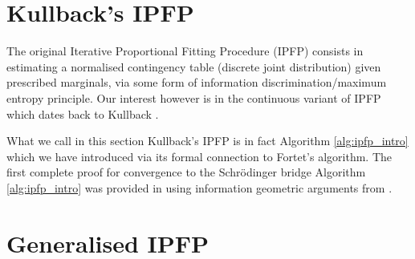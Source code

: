 \documentclass[a4paper,12pt,twoside,openright]{report}
\theoremstyle{definition}
\begin{document}
\section{Kullback's IPFP}
The original Iterative Proportional Fitting Procedure (IPFP) consists in estimating a normalised contingency table (discrete joint distribution) given prescribed marginals, via some form of information discrimination/maximum entropy principle. Our interest however is in the continuous variant of IPFP which dates back to Kullback \citep{kullback1968probability}.

What we call in this section Kullback's IPFP is in fact Algorithm \ref{alg:ipfp_intro} which we have introduced via its formal connection to Fortet's algorithm.  The first complete proof for convergence to the  Schrödinger bridge Algorithm \ref{alg:ipfp_intro} was provided in \cite{ruschendorf1995convergence} using information geometric arguments from \cite{csiszar1975divergence}.


\section{Generalised IPFP}
\end{document}
